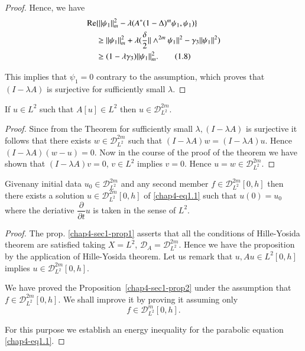 \begin{proof}
Hence, we have 
\begin{align*}
\operatorname{Re} & \{ || \psi_1 ||^2 _m - \lambda (A^* (1 - \Delta)^m  \psi_1,
\psi_1 ) \} \\ 
& \geq || \psi_1 ||^2_m + \lambda (\frac{\delta}{2} || \wedge^{2m}
\psi_1 ||^2 - \gamma_3 || \psi_1 ||^2 ) \\  
& \geq(1 - \lambda \gamma_3 ) || \psi_1 ||^2_m.
\tag{1.8}\label{chap4-eq1.8} 
\end{align*}

This implies that $\psi_1 = 0$ contrary to the assumption, which
proves that $(I - \lambda A)$ is surjective for sufficiently small $\lambda$.  
\end{proof}

\setcounter{corollary}{0}
\begin{corollary}\label{chap4-sec1-coro1}%
If $u \in L^2$ such that $A[u] \in L^2 $ then $u
  \in \mathscr{D}^{2m}_{L^2}$.  
\end{corollary}

\begin{proof}
Since from the Theorem for sufficiently small $\lambda, (I - \lambda
A)$ is surjective it follows that there exists $w
\in\mathscr{D}^{2m}_{L^2}$ such that $(I - \lambda A)  w= (I -
\lambda A )u$. Hence $(I - \lambda A) (w  - u) = 0$. Now in the
course of the proof of the theorem we have shown that $(I - \lambda A)
v =0$, $v \in L^2$ implies $v = 0$. Hence $u = w \in
\mathscr{D}^{2m}_{L^2}$. 
\end{proof}

\begin{proposition}\label{chap4-sec1-prop2}%
Given\pageoriginale any initial data $u_0 \in
\mathscr{D}^{2m}_{L^2}$ and any 
second member $f \in \mathscr{D}^{2m}_{L^2} [ 0, h]$ then
there exists a solution $u \in \mathscr{D}^{2m}_{L^2} [ 0, h]$
of \eqref{chap4-eq1.1} such that $u(0) = u_0$  where the deriative
$\dfrac{\partial}{\partial t} u $ is taken in the sense of $L^2$.  
\end{proposition}

\begin{proof}
The prop. \ref{chap4-sec1-prop1} asserts that all the conditions of
Hille-Yosida theorem 
are satisfied taking $X = L^2$, $\mathscr{D}_A =
\mathscr{D}^{2m}_{L^2}$. Hence we have the proposition by the
application of Hille-Yosida theorem. Let us remark that $u, A u
\in L^2 [0,h]$ implies $u \in \mathscr{D}^{2m}_{L^2}
            [0, h]$.   

We have proved the Proposition~\ref{chap4-sec1-prop2} under the
assumption that $f 
\in \mathscr{D}^{2m}_{L^2} [ 0, h]$. We shall improve it by
proving it assuming only 
$$
f \in \mathscr{D}^{m}_{L^2} [ 0,
  h]. 
$$

For this purpose we establish an energy inequality for the
parabolic equation \eqref{chap4-eq1.1}. 
\end{proof}

